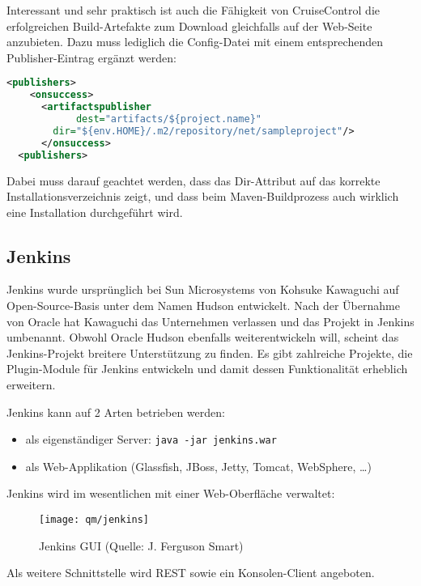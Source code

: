 \newslide
Interessant und sehr praktisch ist auch die Fähigkeit von CruiseControl die
erfolgreichen Build-Artefakte zum Download gleichfalls auf der Web-Seite
anzubieten. Dazu muss lediglich die Config-Datei mit einem entsprechenden
Publisher-Eintrag ergänzt werden:
\begin{lstlisting}[language=xml,
  morekeywords={publishers,onsuccess,artifactspublisher}]
  <publishers>
    <onsuccess>
      <artifactspublisher
            dest="artifacts/${project.name}"
	    dir="${env.HOME}/.m2/repository/net/sampleproject"/>
      </onsuccess>
  <publishers>
\end{lstlisting}
Dabei muss darauf geachtet werden, dass das Dir-Attribut auf das
korrekte Installationsverzeichnis zeigt, und dass beim
Maven-Buildprozess auch wirklich eine Installation durchgeführt wird.
%
\subsection{Jenkins}
Jenkins wurde ursprünglich bei Sun Microsystems von Kohsuke Kawaguchi
auf Open-Source-Basis unter dem Namen Hudson entwickelt. Nach der
Übernahme von Oracle hat Kawaguchi das Unternehmen verlassen und das
Projekt in Jenkins umbenannt. Obwohl Oracle Hudson ebenfalls
weiterentwickeln will, scheint das Jenkins-Projekt breitere
Unterstützung  zu finden.
Es gibt zahlreiche Projekte, die Plugin-Module
für Jenkins entwickeln und damit dessen Funktionalität erheblich
erweitern.

Jenkins kann auf 2 Arten betrieben werden:
\begin{itemize}
\item als eigenständiger Server: \verb+java -jar jenkins.war+
\item als Web-Applikation (Glassfish, JBoss, Jetty, Tomcat, WebSphere,
  \ldots)
\end{itemize}
Jenkins wird im wesentlichen mit einer Web-Oberfläche verwaltet:
\begin{figure}[H]
  \centering
  \texttt{[image: qm/jenkins]}
  \caption{Jenkins GUI (Quelle: J. Ferguson Smart)}
  \label{fig:jenkins}
\end{figure}
Als weitere Schnittstelle wird REST sowie ein
Konsolen-Client angeboten.

